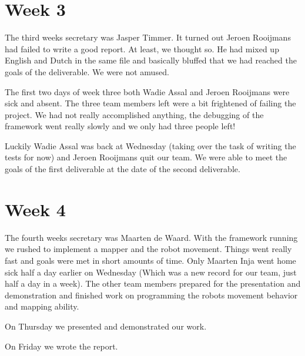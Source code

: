 \documentclass[a4paper,10pt]{article}
\begin{document}
\section{Week 3}
The third weeks secretary was Jasper Timmer. 
It turned out Jeroen Rooijmans had failed to write a good report. At least, we thought so. He had mixed up English 
and Dutch in the same file and basically bluffed that we had reached the goals of the deliverable. We were not amused. 

The first two days of week three both Wadie Assal and Jeroen Rooijmans were sick and absent. The three team members left
were a bit frightened of failing the project. We had not really accomplished anything, the debugging of the framework
went really slowly and we only had three people left! 

Luckily Wadie Assal was back at Wednesday (taking over the task of writing the tests for now) and Jeroen Rooijmans quit our team. 
We were able to meet the goals of the first deliverable at the date of 
the second deliverable. 

\section{Week 4}
The fourth weeks secretary was Maarten de Waard. With the framework running we rushed to implement a mapper and 
the robot movement. Things went really fast and goals were met in short amounts of time. Only Maarten Inja 
went home sick half a day earlier on Wednesday (Which was a new record for our team, just half a day in a week).
The other team members prepared for the presentation and demonstration and finished work on programming the robots
movement behavior and mapping ability.

On Thursday we presented and demonstrated our work. 

On Friday we wrote the report. 
\end{document}
